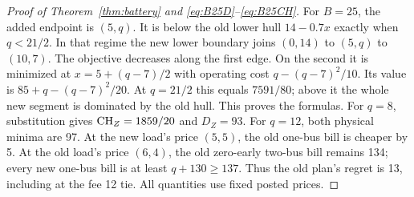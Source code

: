 \begin{proof}[Proof of Theorem~\ref{thm:battery} and
\eqref{eq:B25D}--\eqref{eq:B25CH}]
For $B=25$, the added endpoint is $(5,q)$. It is below the old lower
hull $14-0.7x$ exactly when $q<21/2$. In that regime the new lower
boundary joins $(0,14)$ to $(5,q)$ to $(10,7)$. The objective decreases
along the first edge. On the second it is minimized at
$x=5+(q-7)/2$ with operating cost $q-(q-7)^2/10$. Its value is
$85+q-(q-7)^2/20$. At $q=21/2$ this equals $7591/80$; above it the
whole new segment is dominated by the old hull. This proves the formulas.
For $q=8$, substitution gives $\mathrm{CH}_Z=1859/20$ and $D_Z=93$.
For $q=12$, both physical minima are 97. At the new load's price $(5,5)$,
the old one-bus bill is cheaper by 5. At the old load's price $(6,4)$,
the old zero-early two-bus bill remains 134; every new one-bus bill is
at least $q+130\ge137$. Thus the old plan's regret is 13, including
at the fee 12 tie. All quantities use fixed posted prices.
\end{proof}

